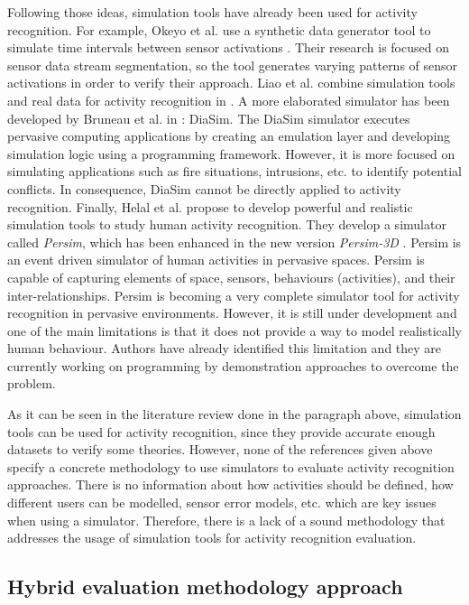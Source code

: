 Following those ideas, simulation tools have already been used for activity recognition. For example,   Okeyo et al. use a synthetic data generator tool to simulate time intervals between sensor activations \cite{Okeyo2012a}. Their research is focused on sensor data stream segmentation, so the tool generates varying patterns of sensor activations in order to verify their approach. Liao et al. combine simulation tools and real data for activity recognition in \cite{Liao2006}. A more elaborated simulator has been developed by Bruneau et al. in \cite{Bruneau2009}: DiaSim. The DiaSim simulator executes pervasive computing applications by creating an emulation layer and developing simulation logic using a programming framework. However, it is more focused on simulating applications such as fire situations, intrusions, etc. to identify potential conflicts. In consequence, DiaSim cannot be directly applied to activity recognition. Finally, Helal et al. propose to develop powerful and realistic simulation tools to study human activity recognition. They develop a simulator called \textit{Persim}, which has been enhanced in the new version \textit{Persim-3D} \cite{Helal2012}. Persim is an event driven simulator of human activities in pervasive spaces. Persim is capable of capturing elements of space, sensors, behaviours (activities), and their inter-relationships. Persim is becoming a very complete simulator tool for activity recognition in pervasive environments. However, it is still under development and one of the main limitations is that it does not provide a way to model realistically human behaviour. Authors have already identified this limitation and they are currently working on programming by demonstration approaches to overcome the problem.

As it can be seen in the literature review done in the paragraph above, simulation tools can be used for activity recognition, since they provide accurate enough datasets to verify some theories. However, none of the references given above specify a concrete methodology to use simulators to evaluate activity recognition approaches. There is no information about how activities should be defined, how different users can be modelled, sensor error models, etc. which are key issues when using a simulator. Therefore, there is a lack of a sound methodology that addresses the usage of simulation tools for activity recognition evaluation. 

\subsection{Hybrid evaluation methodology approach}
\label{subsec:evaluation:hybrid}

